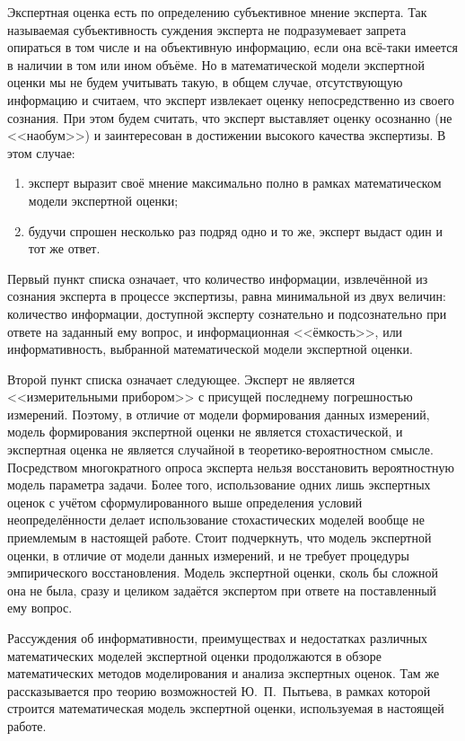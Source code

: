 Экспертная оценка есть по определению субъективное мнение эксперта. Так называемая субъективность суждения эксперта не подразумевает запрета опираться в том числе и на объективную информацию, если она всё-таки имеется в наличии в том или ином объёме. Но в математической модели экспертной оценки мы не будем учитывать такую, в общем случае, отсутствующую информацию и считаем, что эксперт извлекает оценку непосредственно из своего сознания. При этом будем считать, что эксперт выставляет оценку осознанно (не <<наобум>>) и заинтересован в достижении высокого качества экспертизы. %
В этом случае:
\begin{enumerate}
 \item эксперт выразит своё мнение максимально полно в рамках математическом модели экспертной оценки;
 \item будучи спрошен несколько раз подряд одно и то же, эксперт выдаст один и тот же ответ. 
\end{enumerate}

Первый пункт списка означает, что количество информации, извлечённой из сознания эксперта в процессе экспертизы, равна минимальной из двух величин: количество информации, доступной эксперту сознательно и подсознательно при ответе на заданный ему вопрос, и информационная <<ёмкость>>, или информативность, выбранной математической модели экспертной оценки.

Второй пункт списка означает следующее. Эксперт не является <<измерительными прибором>> с присущей последнему погрешностью измерений. Поэтому, в отличие от модели формирования данных измерений, модель формирования экспертной оценки не является стохастической, и экспертная оценка не является случайной в теоретико-вероятностном смысле. Посредством многократного опроса эксперта нельзя восстановить вероятностную модель параметра задачи. Более того, использование одних лишь экспертных оценок с учётом сформулированного выше определения условий неопределённости делает использование стохастических моделей вообще не приемлемым в настоящей работе. Стоит подчеркнуть, что модель экспертной оценки, в отличие от модели данных измерений, и не требует процедуры эмпирического восстановления. Модель экспертной оценки, сколь бы сложной она не была, сразу и целиком задаётся экспертом при ответе на поставленный ему вопрос.

Рассуждения об информативности, преимуществах и недостатках различных математических моделей экспертной оценки продолжаются в обзоре математических методов моделирования и анализа экспертных оценок. Там же рассказывается про теорию возможностей Ю.~П.~Пытьева, в рамках которой строится математическая модель экспертной оценки, используемая в настоящей работе.  

